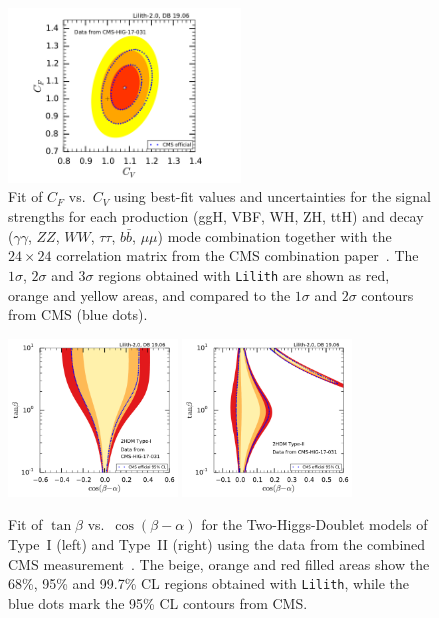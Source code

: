 \begin{figure}[hbt!]\centering
\includegraphics[width=0.55\textwidth]{validation/CMS/HIG-17-031-CVCF.pdf}%
\vspace*{-2mm}
\caption{Fit of $C_F$ vs.\ $C_V$ using best-fit values and uncertainties for the signal strengths for each production (ggH, VBF, WH, ZH, ttH) 
and decay ($\gamma\gamma$, $ZZ$, $WW$, $\tau\tau$, $b\bar b$, $\mu\mu$) mode combination together with the 
$24\times 24$ correlation matrix from the CMS combination paper~\cite{Sirunyan:2018koj}. 
The  $1\sigma$,  $2\sigma$ and $3\sigma$ regions obtained with {\tt Lilith} are shown as red, orange and yellow areas, 
and compared to the $1\sigma$ and $2\sigma$ contours from CMS (blue dots).}
\label{fig:validation_cms_combination}
\end{figure}

\begin{figure}[t!]\centering
\includegraphics[width=0.4\textwidth]{validation/CMS/HIG-17-031-2HDM-Type1.pdf}%
\includegraphics[width=0.4\textwidth]{validation/CMS/HIG-17-031-2HDM-Type2.pdf}%
\vspace*{-2mm}
\caption{Fit of $\tan\beta$ vs.\ $\cos(\beta-\alpha)$ for the Two-Higgs-Doublet models of Type~I (left) and Type~II (right) 
using the data from the combined CMS measurement~\cite{Sirunyan:2018koj}. 
The beige, orange and red filled areas show the 68\%, 95\% and 99.7\% CL regions obtained with {\tt Lilith}, 
while the blue dots mark the 95\% CL contours from CMS.}
\label{fig:validation_cms_2hdm}
\end{figure}

